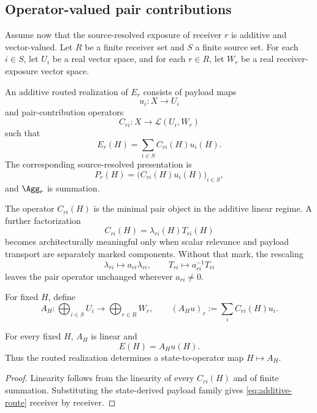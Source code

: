 \subsection{Operator-valued pair contributions}

Assume now that the source-resolved exposure of receiver $r$ is additive and vector-valued. Let $R$ be a finite receiver set and $S$ a finite source set. For each $i\in S$, let $U_i$ be a real vector space, and for each $r\in R$, let $W_r$ be a real receiver-exposure vector space.

\begin{definition}\label{def:additive-routed-realization}
An additive routed realization of $E_r$ consists of payload maps
\[
u_i:X\to U_i
\]
and pair-contribution operators
\[
C_{ri}:X\to\mathcal L(U_i,W_r)
\]
such that
\begin{equation}\label{eq:additive-route}
\boxed{
E_r(H)
=
\sum_{i\in S}C_{ri}(H)u_i(H).
}
\end{equation}
The corresponding source-resolved presentation is
\[
P_r(H)=\bigl(C_{ri}(H)u_i(H)\bigr)_{i\in S},
\]
and $\Agg_r$ is summation.
\end{definition}

The operator $C_{ri}(H)$ is the minimal pair object in the additive linear regime. A further factorization
\begin{equation}\label{eq:scalar-transport-factorization}
C_{ri}(H)=\lambda_{ri}(H)T_{ri}(H)
\end{equation}
becomes architecturally meaningful only when scalar relevance and payload transport are separately marked components. Without that mark, the rescaling
\[
\lambda_{ri}\mapsto a_{ri}\lambda_{ri},
\qquad
T_{ri}\mapsto a_{ri}^{-1}T_{ri}
\]
leaves the pair operator unchanged wherever $a_{ri}\neq0$.

For fixed $H$, define
\begin{equation}\label{eq:state-operator}
A_H:\bigoplus_{i\in S}U_i\to\bigoplus_{r\in R}W_r,
\qquad
(A_Hu)_r:=\sum_iC_{ri}(H)u_i.
\end{equation}

\begin{proposition}\label{prop:routed-operator-field}
For every fixed $H$, $A_H$ is linear and
\[
E(H)=A_Hu(H).
\]
Thus the routed realization determines a state-to-operator map $H\mapsto A_H$.
\end{proposition}

\begin{proof}
Linearity follows from the linearity of every $C_{ri}(H)$ and of finite summation. Substituting the state-derived payload family gives \eqref{eq:additive-route} receiver by receiver.
\end{proof}

